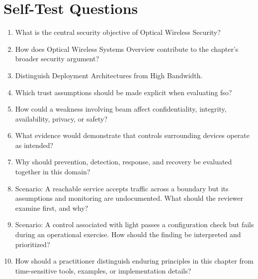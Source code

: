 \documentclass[11pt]{article}
\begin{document}
\section*{Self-Test Questions}
\begin{enumerate}
\item What is the central security objective of Optical Wireless Security?
\item How does Optical Wireless Systems Overview contribute to the chapter's broader security argument?
\item Distinguish Deployment Architectures from High Bandwidth.
\item Which trust assumptions should be made explicit when evaluating fso?
\item How could a weakness involving beam affect confidentiality, integrity, availability, privacy, or safety?
\item What evidence would demonstrate that controls surrounding devices operate as intended?
\item Why should prevention, detection, response, and recovery be evaluated together in this domain?
\item Scenario: A reachable service accepts traffic across a boundary but its assumptions and monitoring are undocumented. What should the reviewer examine first, and why?
\item Scenario: A control associated with light passes a configuration check but fails during an operational exercise. How should the finding be interpreted and prioritized?
\item How should a practitioner distinguish enduring principles in this chapter from time-sensitive tools, examples, or implementation details?
\end{enumerate}
\end{document}
